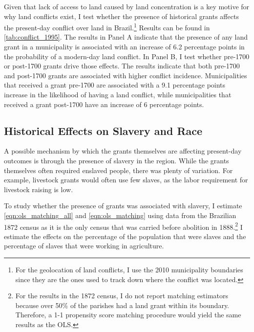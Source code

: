 \documentclass[11pt]{article}
\newcommand{\red}[1]{\textcolor{red}{#1}}
\begin{document}


Given that lack of access to land caused by land concentration is a key motive for why land conflicts exist, I test whether the presence of historical grants affects the present-day conflict over land in Brazil.\footnote{For the geolocation of land conflicts, I use the 2010 municipality boundaries since they are the ones used to track down where the conflict was located.}
Results can be found in \autoref{tab:conflict_1995}. 
The results in Panel A indicate that the presence of any land grant in a municipality is associated with an increase of 6.2 percentage points in the probability of a modern-day land conflict. 
In Panel B, I test whether pre-1700 or post-1700 grants drive those effects.
The results indicate that both pre-1700 and post-1700 grants are associated with higher conflict incidence. 
Municipalities that received a grant pre-1700 are associated with a 9.1 percentage points increase in the likelihood of having a land conflict, while municipalities that received a grant post-1700 have an increase of 6 percentage points. 

\subsection{Historical Effects on Slavery and Race}

A possible mechanism by which the grants themselves are affecting present-day outcomes is through the presence of slavery in the region. 
While the grants themselves often required enslaved people, there was plenty of variation.
For example, livestock grants would often use few slaves, as the labor requirement for livestock raising is low.

To study whether the presence of grants was associated with slavery, I estimate \autoref{eqn:ols_matching_all} and \autoref{eqn:ols_matching} using data from the Brazilian 1872 census as it is the only census that was carried before abolition in 1888.\footnote{For the results in the 1872 census, I do not report matching estimators because over 50\% of the parishes had a land grant within its boundary. 
Therefore, a 1-1 propensity score matching procedure would yield the same results as the OLS.}
I estimate the effects on the percentage of the population that were slaves and the percentage of slaves that were working in agriculture. 
\end{document}
